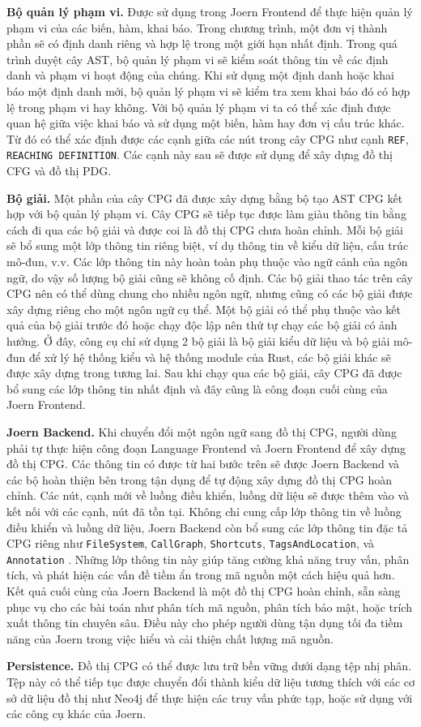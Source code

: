 \textbf{Bộ quản lý phạm vi.} Được sử dụng trong Joern Frontend để thực hiện quản lý phạm vi của các biến, hàm, khai báo.
Trong chương trình, một đơn vị thành phần sẽ có định danh riêng và hợp lệ trong một giới hạn nhất định.
Trong quá trình duyệt cây AST, bộ quản lý phạm vi sẽ kiểm soát thông tin về các định danh và phạm vi hoạt động của chúng.
Khi sử dụng một định danh hoặc khai báo một định danh mới, bộ quản lý phạm vi sẽ kiểm tra xem khai báo đó có hợp lệ trong phạm vi hay không.
Với bộ quản lý phạm vi ta có thể xác định được quan hệ giữa việc khai báo và sử dụng một biến, hàm hay đơn vị cấu trúc khác.
Từ đó có thể xác định được các cạnh giữa các nút trong cây CPG như cạnh \texttt{REF}, \texttt{REACHING DEFINITION}.
Các cạnh này sau sẽ được sử dụng để xây dựng đồ thị CFG và đồ thị PDG.

\textbf{Bộ giải.} Một phần của cây CPG đã được xây dựng bằng bộ tạo AST CPG kết hợp với bộ quản lý phạm vi.
Cây CPG sẽ tiếp tục được làm giàu thông tin bằng cách đi qua các bộ giải và được coi là đồ thị CPG chưa hoàn chỉnh.
Mỗi bộ giải sẽ bổ sung một lớp thông tin riêng biệt, ví dụ thông tin về kiểu dữ liệu, cấu trúc mô-đun, v.v.
Các lớp thông tin này hoàn toàn phụ thuộc vào ngữ cảnh của ngôn ngữ, do vậy số lượng bộ giải cũng sẽ không cố định.
Các bộ giải thao tác trên cây CPG nên có thể dùng chung cho nhiều ngôn ngữ, nhưng cũng có các bộ giải được xây dựng riêng cho một ngôn ngữ cụ thể.
Một bộ giải có thể phụ thuộc vào kết quả của bộ giải trước đó hoặc chạy độc lập nên thứ tự chạy các bộ giải có ảnh hưởng.
Ở đây, công cụ chỉ sử dụng 2 bộ giải là bộ giải kiểu dữ liệu và bộ giải mô-đun để xử lý hệ thống kiểu và hệ thống module của Rust, các bộ giải khác sẽ được xây dựng trong tương lai.
Sau khi chạy qua các bộ giải, cây CPG đã được bổ sung các lớp thông tin nhất định và đây cũng là công đoạn cuối cùng của Joern Frontend.

\textbf{Joern Backend.} Khi chuyển đổi một ngôn ngữ sang đồ thị CPG, người dùng phải tự thực hiện công đoạn Language Frontend và Joern Frontend để xây dựng đồ thị CPG.
Các thông tin có được từ hai bước trên sẽ được Joern Backend và các bộ hoàn thiện bên trong tận dụng để tự động xây dựng đồ thị CPG hoàn chỉnh.
Các nút, cạnh mới về luồng điều khiển, luồng dữ liệu sẽ được thêm vào và kết nối với các cạnh, nút đã tồn tại.
Không chỉ cung cấp lớp thông tin về luồng điều khiển và luồng dữ liệu, Joern Backend còn bổ sung các lớp thông tin đặc tả CPG riêng như \texttt{FileSystem}, \texttt{CallGraph}, \texttt{Shortcuts}, \texttt{TagsAndLocation}, và \texttt{Annotation} \cite{joernCodeProperty}.
Những lớp thông tin này giúp tăng cường khả năng truy vấn, phân tích, và phát hiện các vấn đề tiềm ẩn trong mã nguồn một cách hiệu quả hơn.
Kết quả cuối cùng của Joern Backend là một đồ thị CPG hoàn chỉnh, sẵn sàng phục vụ cho các bài toán như phân tích mã nguồn, phân tích bảo mật, hoặc trích xuất thông tin chuyên sâu.
Điều này cho phép người dùng tận dụng tối đa tiềm năng của Joern trong việc hiểu và cải thiện chất lượng mã nguồn.

\textbf{Persistence.} Đồ thị CPG có thể được lưu trữ bền vững dưới dạng tệp nhị phân.
Tệp này có thể tiếp tục được chuyển đổi thành kiểu dữ liệu tương thích với các cơ sở dữ liệu đồ thị như Neo4j để thực hiện các truy vấn phức tạp, hoặc sử dụng với các công cụ khác của Joern.
